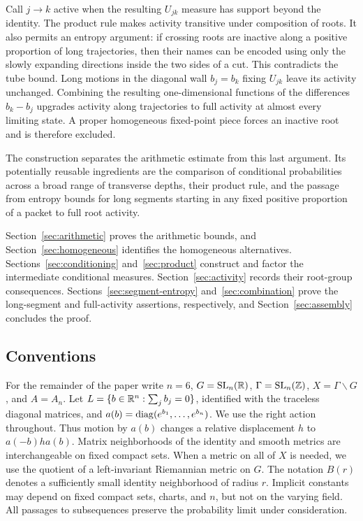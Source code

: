 Call $j\to k$ active when the resulting $U_{jk}$ measure has support
beyond the identity. The product rule makes activity transitive under
composition of roots. It also permits an entropy argument: if crossing
roots are inactive along a positive proportion of long trajectories,
then their names can be encoded using only the slowly expanding
directions inside the two sides of a cut. This contradicts the tube
bound. Long motions in the diagonal wall $b_j=b_k$ fixing $U_{jk}$ leave
its activity unchanged. Combining the resulting one-dimensional functions
of the differences $b_k-b_j$ upgrades activity along trajectories to full
activity at almost every limiting state. A proper homogeneous
fixed-point piece forces an inactive root and is therefore excluded.

The construction separates the arithmetic estimate from this last
argument. Its potentially reusable ingredients are the comparison of
conditional probabilities across a broad range of transverse depths,
their product rule, and the passage from entropy bounds for long segments
starting in any fixed positive proportion of a packet to full root activity.

Section~\ref{sec:arithmetic} proves the arithmetic bounds, and
Section~\ref{sec:homogeneous} identifies the homogeneous alternatives.
Sections~\ref{sec:conditioning} and~\ref{sec:product} construct and
factor the intermediate conditional measures.
Section~\ref{sec:activity} records their root-group consequences.
Sections~\ref{sec:segment-entropy} and~\ref{sec:combination} prove the
long-segment and full-activity assertions, respectively, and
Section~\ref{sec:assembly} concludes the proof.

\subsection{Conventions}

For the remainder of the paper write $n=6$,
$G=\operatorname{SL}_n(\mathbb R)$, $\Gamma=\operatorname{SL}_n(\mathbb Z)$, $X=\Gamma\backslash G$,
and $A=A_n$. Let $L=\{b\in\mathbb R^n:\sum_j b_j=0\}$, identified with the
traceless diagonal matrices, and
$a(b)=\operatorname{diag}(e^{b_1},\ldots,e^{b_n})$. We use the right action
throughout. Thus motion by $a(b)$ changes a relative displacement $h$
to $a(-b)ha(b)$.
Matrix neighborhoods of the identity and smooth metrics are interchangeable
on fixed compact sets. When a metric on all of $X$ is needed, we use
the quotient of a left-invariant Riemannian metric on $G$.
The notation $B(r)$ denotes a sufficiently small identity neighborhood
of radius $r$. Implicit constants may depend on fixed compact sets,
charts, and $n$, but not on the varying field. All passages to
subsequences preserve the probability limit under consideration.
